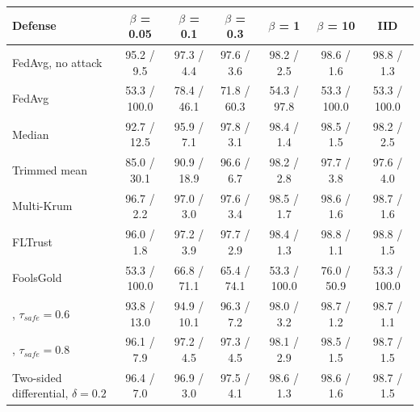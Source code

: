 \begin{tabular}{@{}lcccccc@{}}
\toprule
Defense & $\beta$ = 0.05 & $\beta$ = 0.1 & $\beta$ = 0.3 & $\beta$ = 1 & $\beta$ = 10 & IID \\
\midrule
FedAvg, no attack & 95.2 / 9.5 & 97.3 / 4.4 & 97.6 / 3.6 & 98.2 / 2.5 & 98.6 / 1.6 & 98.8 / 1.3 \\
FedAvg & 53.3 / 100.0 & 78.4 / 46.1 & 71.8 / 60.3 & 54.3 / 97.8 & 53.3 / 100.0 & 53.3 / 100.0 \\
Median & 92.7 / 12.5 & 95.9 / 7.1 & 97.8 / 3.1 & 98.4 / 1.4 & 98.5 / 1.5 & 98.2 / 2.5 \\
Trimmed mean & 85.0 / 30.1 & 90.9 / 18.9 & 96.6 / 6.7 & 98.2 / 2.8 & 97.7 / 3.8 & 97.6 / 4.0 \\
Multi-Krum & 96.7 / 2.2 & 97.0 / 3.0 & 97.6 / 3.4 & 98.5 / 1.7 & 98.6 / 1.6 & 98.7 / 1.6 \\
FLTrust & 96.0 / 1.8 & 97.2 / 3.9 & 97.7 / 2.9 & 98.4 / 1.3 & 98.8 / 1.1 & 98.8 / 1.5 \\
FoolsGold & 53.3 / 100.0 & 66.8 / 71.1 & 65.4 / 74.1 & 53.3 / 100.0 & 76.0 / 50.9 & 53.3 / 100.0 \\
\SF{}, $\tau_{safe}=0.6$ & 93.8 / 13.0 & 94.9 / 10.1 & 96.3 / 7.2 & 98.0 / 3.2 & 98.7 / 1.2 & 98.7 / 1.1 \\
\SF{}, $\tau_{safe}=0.8$ & 96.1 / 7.9 & 97.2 / 4.5 & 97.3 / 4.5 & 98.1 / 2.9 & 98.5 / 1.5 & 98.7 / 1.5 \\
Two-sided differential, $\delta=0.2$ & 96.4 / 7.0 & 96.9 / 3.0 & 97.5 / 4.1 & 98.6 / 1.3 & 98.6 / 1.6 & 98.7 / 1.5 \\
\bottomrule
\end{tabular}
